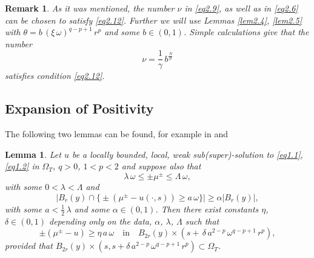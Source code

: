 \documentclass[a4paper,11pt,fullpage]{article}
\numberwithin{equation}{section}
\newtheorem{lemma}{Lemma}[section]
\newtheorem{remark}{Remark}[section]
\begin{document}
\begin{remark}
As it was mentioned, the number $\nu$ in \eqref{eq2.9}, as well as in \eqref{eq2.6} can be chosen to satisfy \eqref{eq2.12}.
Further we will use Lemmas \ref{lem2.4}, \ref{lem2.5} with $\theta=b\,(\xi\,\omega)^{q-p+1}\,r^p$ and some   $b\in (0, 1)$. Simple calculations give that the number
$$\nu=\frac{1}{\gamma}\,b^{\frac{N}{p}}$$
satisfies  condition \eqref{eq2.12}.
\end{remark}

\subsection{Expansion of Positivity}
The following two lemmas can be found, for example in \cite[Lemma 3.4]{Lia} and \cite[Lemma 3.3]{Bog2}

\begin{lemma}\label{lem2.6}
Let $u$ be a locally bounded, local, weak sub(super)-solution to \eqref{eq1.1}, \eqref{eq1.2} in $\Omega_T$, $q>0$, $1<p<2$ and suppose also 
that
\begin{equation}\label{eq2.13}
\lambda\,\omega \leqslant \pm \mu^{\pm}\leqslant \Lambda\,\omega,
\end{equation}
with some $0<\lambda <\Lambda$ and
\begin{equation}\label{eq2.14}
\big|B_r(y)\cap\big\{\pm(\mu^{\pm}-u(\cdot, s))\geqslant a\,\omega\big\}\big|\geqslant \alpha |B_r(y)|,
\end{equation}
with some $a<\frac{1}{2}\,\lambda$ and some $\alpha \in (0, 1)$. Then there exist constants $\eta$, $\delta\in (0, 1)$ depending
only on the data,  $\alpha$, $\lambda$, $\Lambda$ such that
\begin{equation}\label{eq2.15}
\pm(\mu^{\pm}-u)\geqslant \eta\,a\,\omega \quad \text{in}\quad  B_{2r}(y)\times (s+\,\delta\,a^{2-p}\,\omega^{q-p+1}\,r^p),
\end{equation}
provided that $B_{2r}(y)\times (s, s+ \delta\,a^{2-p}\,\omega^{q-p+1}\,r^p)\subset \Omega_T$.
 \end{lemma}
 
\end{document}
